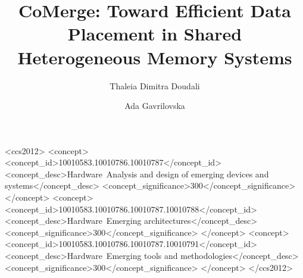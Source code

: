 \documentclass[sigconf]{acmart}
\begin{document}
\title{CoMerge: Toward Efficient Data Placement in Shared Heterogeneous Memory Systems}

\author{Thaleia Dimitra Doudali}

\author{Ada Gavrilovska}



\thispagestyle{empty}



\begin{CCSXML}
<ccs2012>
<concept>
<concept_id>10010583.10010786.10010787</concept_id>
<concept_desc>Hardware~Analysis and design of emerging devices and systems</concept_desc>
<concept_significance>300</concept_significance>
</concept>
<concept>
<concept_id>10010583.10010786.10010787.10010788</concept_id>
<concept_desc>Hardware~Emerging architectures</concept_desc>
<concept_significance>300</concept_significance>
</concept>
<concept>
<concept_id>10010583.10010786.10010787.10010791</concept_id>
<concept_desc>Hardware~Emerging tools and methodologies</concept_desc>
<concept_significance>300</concept_significance>
</concept>
</ccs2012>
\end{CCSXML}




\maketitle









\end{document}
